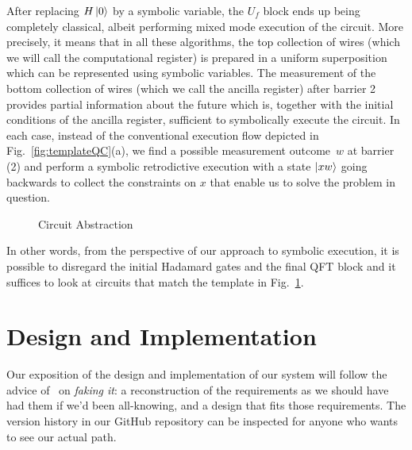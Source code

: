 \documentclass[sigplan,screen]{acmart}
\theoremstyle{definition}
\begin{document}
After replacing $H\ket{0}$ by a symbolic variable, the $U_f$ block
ends up being completely classical, albeit performing mixed mode
execution of the circuit. More precisely, it means that in all these
algorithms, the top collection of wires (which we will call the
computational register) is prepared in a uniform superposition which
can be represented using symbolic variables. The measurement of the
bottom collection of wires (which we call the ancilla register) after
barrier 2 provides partial information about the future which is,
together with the initial conditions of the ancilla register,
sufficient to symbolically execute the circuit. In each case, instead
of the conventional execution flow depicted in
Fig.~\ref{fig:templateQC}(a), we find a possible measurement
outcome~$w$ at barrier (2) and perform a symbolic retrodictive
execution with a state $\ket{xw}$ going backwards to collect the
constraints on $x$ that enable us to solve the problem in question.

\begin{figure}[t]
\caption{\label{fig:CircuitAbstraction}Circuit Abstraction}
\end{figure}

In other words, from the perspective of our approach to symbolic
execution, it is possible to disregard the initial Hadamard gates and
the final QFT block and it suffices to look at circuits that match the
template in Fig.~\ref{fig:CircuitAbstraction}.

\section{Design and Implementation}
\label{sec4}

Our exposition of the design and implementation of our system will
follow the advice of~\citet{parnas1986rational} on \emph{faking it}:
a reconstruction of the requirements as we should have had them if
we'd been all-knowing, and a design that fits those requirements. The
version history in our GitHub repository can be inspected for anyone
who wants to see our actual path.
\end{document}
